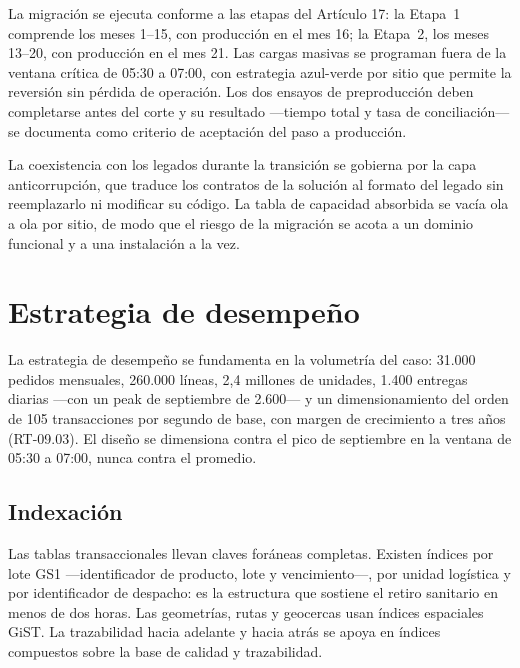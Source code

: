 La migración se ejecuta conforme a las etapas del Artículo 17: la Etapa~1
comprende los meses 1--15, con producción en el mes 16; la Etapa~2, los
meses 13--20, con producción en el mes 21.  Las cargas masivas se programan
fuera de la ventana crítica de 05:30 a 07:00, con estrategia azul-verde por
sitio que permite la reversión sin pérdida de operación.  Los dos ensayos de
preproducción deben completarse antes del corte y su resultado ---tiempo total
y tasa de conciliación--- se documenta como criterio de aceptación del paso a
producción.

La coexistencia con los legados durante la transición se gobierna por la capa
anticorrupción, que traduce los contratos de la solución al formato del
legado sin reemplazarlo ni modificar su código.  La tabla de capacidad
absorbida se vacía ola a ola por sitio, de modo que el riesgo de la migración
se acota a un dominio funcional y a una instalación a la vez.


\section{Estrategia de desempeño}
\label{sec:desempeno}

La estrategia de desempeño se fundamenta en la volumetría del caso: 31.000
pedidos mensuales, 260.000 líneas, 2,4 millones de unidades, 1.400 entregas
diarias ---con un peak de septiembre de 2.600--- y un dimensionamiento del
orden de 105 transacciones por segundo de base, con margen de crecimiento a
tres años (RT-09.03).  El diseño se dimensiona contra el pico de septiembre en
la ventana de 05:30 a 07:00, nunca contra el promedio.

\subsection{Indexación}
\label{sec:indexacion}

Las tablas transaccionales llevan claves foráneas completas.  Existen índices
por lote GS1 ---identificador de producto, lote y vencimiento---, por unidad
logística y por identificador de despacho: es la estructura que sostiene el
retiro sanitario en menos de dos horas.  Las geometrías, rutas y geocercas
usan índices espaciales GiST.  La trazabilidad hacia adelante y hacia atrás se
apoya en índices compuestos sobre la base de calidad y trazabilidad.

